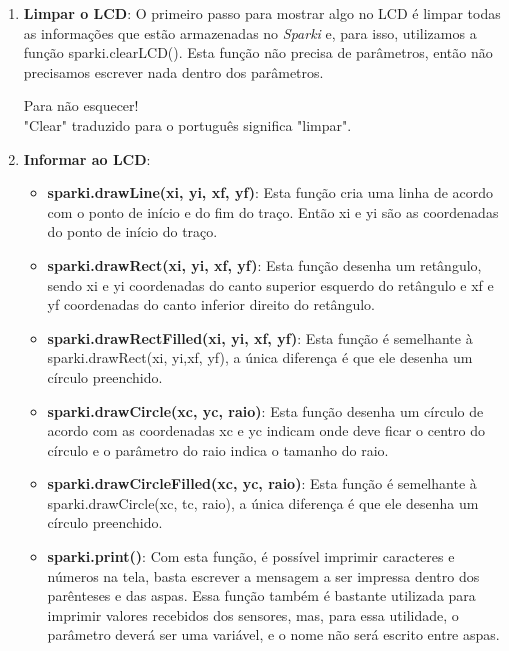 \documentclass[conference]{IEEEtran}
\begin{document}
    \par
    \begin{enumerate}
        \item {\textbf{Limpar o LCD}}: O primeiro passo para mostrar algo no LCD é limpar todas as informações que estão armazenadas no \textit{Sparki} e, para isso, utilizamos a função { \selectfont sparki.clearLCD()}. Esta função não precisa de parâmetros, então não precisamos escrever nada dentro dos parâmetros.
        \begin{center}
            {\color{azulbebe}Para não esquecer!}\\
            "Clear" traduzido para o português significa "limpar".
        \end{center}
        \item {\textbf{Informar ao LCD}}:
            \begin{itemize}
                \item {\textbf{sparki.drawLine(xi, yi, xf, yf)}}: Esta função cria uma linha de acordo com o ponto de início e do fim do traço. Então xi e yi são as coordenadas do ponto de início do traço.
                \item {\textbf{sparki.drawRect(xi, yi, xf, yf)}}: Esta função desenha um retângulo, sendo xi e yi coordenadas do canto superior esquerdo do retângulo e xf e yf coordenadas do canto inferior direito do retângulo.
                \item {\textbf{sparki.drawRectFilled(xi, yi, xf, yf)}}: Esta função é semelhante à {\selectfont sparki.drawRect(xi, yi,xf, yf)}, a única diferença é que ele desenha um círculo preenchido.
                \item {\textbf{sparki.drawCircle(xc, yc, raio)}}: Esta função desenha um círculo de acordo com as coordenadas xc e yc indicam onde deve ficar o centro do círculo e o parâmetro do { \selectfont raio} indica o tamanho do raio.
                \item {\textbf{sparki.drawCircleFilled(xc, yc, raio)}}: Esta função é semelhante à { \selectfont sparki.drawCircle(xc, tc, raio)}, a única diferença é que ele desenha um círculo preenchido.
                \item {\textbf{sparki.print()}}: Com esta função, é possível imprimir caracteres e números na tela, basta escrever a mensagem a ser impressa dentro dos parênteses e das aspas. Essa função também é bastante utilizada para imprimir valores recebidos dos sensores, mas, para essa utilidade, o parâmetro deverá ser uma variável, e o nome não será escrito entre aspas.

\end{itemize}
\end{enumerate}
\end{document}
